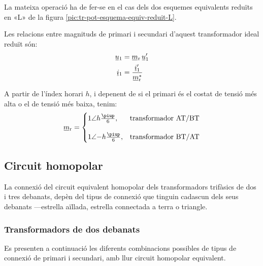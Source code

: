 \begin{center}
    
    \label{fig:esq-reduit-T-complex}
\end{center}

La mateixa operació ha de fer-se en el cas dels dos esquemes equivalents reduïts en «L» de la figura \vref{pic:tr-pot-esquema-equiv-reduit-L}.

Les relacions entre magnituds de primari i secundari d'aquest transformador ideal reduït són:
\begin{subequations}
\begin{align}
    \cmplx{u}_1 &= \cmplx{m}\ped{r}\,\cmplx{u}'_1 \label{eq:UmU-reduit}\\
    \cmplx{i}_1 &= \frac{\cmplx{i}'_1}{\cmplx{m}^*\ped{r}} \label{eq:ImI-reduit}
\end{align}
\end{subequations}

A partir de l'índex horari $h$, i depenent de si el primari és el costat de tensió més alta o el de tensió més baixa, tenim:
\begin{equation}
\cmplx{m}\ped{r} = \begin{cases}
      1\angle h\frac{\piup}{6}, & \text{transformador AT/BT}\\[2.7ex]
      1\angle{-h}\frac{\piup}{6}, & \text{transformador BT/AT}
\end{cases}
\label{eq:rel-transf-cmplx-reduit}
\end{equation}


\subsection{Circuit homopolar}\label{sec:circuit_homopolar}

La connexió del circuit equivalent homopolar dels transformadors trifàsics de dos i tres debanats, depèn del tipus de connexió que tinguin cadascun dels seus debanats ---estrella aïllada, estrella connectada a terra o triangle.

\subsubsection{Transformadors de dos debanats}\label{sec:cir-hom-2-deb}

Es presenten a continuació les diferents combinacions possibles de tipus de connexió de primari i secundari, amb llur circuit homopolar equivalent.

